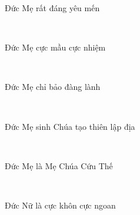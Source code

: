 \documentclass[12pt]{article}
\begin{document}
\begin{paracol}{2}
\begin{rightcolumn}
Đức Mẹ rất đáng yêu mến\\
\end{rightcolumn}

\begin{leftcolumn*}
\Large{\ \ \ }\\
\end{leftcolumn*}

\begin{rightcolumn}
Đức Mẹ cực mầu cực nhiệm\\
\end{rightcolumn}

\begin{leftcolumn*}
\Large{\ \ \ }\\
\end{leftcolumn*}

\begin{rightcolumn}
Đức Mẹ chỉ bảo đàng lành\\
\end{rightcolumn}

\begin{leftcolumn*}
\Large{\ \ \ }\\
\end{leftcolumn*}

\begin{rightcolumn}
Đức Mẹ sinh Chúa tạo thiên lập địa\\
\end{rightcolumn}

\begin{leftcolumn*}
\Large{\ \ \ }\\
\end{leftcolumn*}

\begin{rightcolumn}
Đức Mẹ là Mẹ Chúa Cứu Thế\\
\end{rightcolumn}

\begin{leftcolumn*}
\Large{\ \ \  }\\
\end{leftcolumn*}

\begin{rightcolumn}
Đức Nữ là cực khôn cực ngoan\\
\end{rightcolumn}	


\end{paracol}
\end{document}
